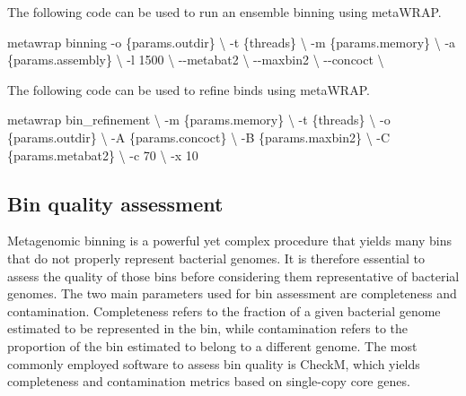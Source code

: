 \documentclass[
]{book}
\newenvironment{Shaded}{\begin{snugshade}}{\end{snugshade}}
\newcommand{\AttributeTok}[1]{\textcolor[rgb]{0.77,0.63,0.00}{#1}}
\newcommand{\DataTypeTok}[1]{\textcolor[rgb]{0.13,0.29,0.53}{#1}}
\newcommand{\ExtensionTok}[1]{#1}
\newcommand{\NormalTok}[1]{#1}
\begin{document}
The following code can be used to run an ensemble binning using metaWRAP.

\begin{Shaded}
\begin{Highlighting}[]
\ExtensionTok{metawrap}\NormalTok{ binning }\AttributeTok{{-}o}\NormalTok{ \{params.outdir\} }\DataTypeTok{\textbackslash{}}
    \AttributeTok{{-}t}\NormalTok{ \{threads\} }\DataTypeTok{\textbackslash{}}
    \AttributeTok{{-}m}\NormalTok{ \{params.memory\} }\DataTypeTok{\textbackslash{}}
    \AttributeTok{{-}a}\NormalTok{ \{params.assembly\} }\DataTypeTok{\textbackslash{}}
    \AttributeTok{{-}l}\NormalTok{ 1500 }\DataTypeTok{\textbackslash{}}
    \AttributeTok{{-}{-}metabat2} \DataTypeTok{\textbackslash{}}
    \AttributeTok{{-}{-}maxbin2} \DataTypeTok{\textbackslash{}}
    \AttributeTok{{-}{-}concoct} \DataTypeTok{\textbackslash{}}
\end{Highlighting}
\end{Shaded}

The following code can be used to refine binds using metaWRAP.

\begin{Shaded}
\begin{Highlighting}[]
\ExtensionTok{metawrap}\NormalTok{ bin\_refinement }\DataTypeTok{\textbackslash{}}
    \AttributeTok{{-}m}\NormalTok{ \{params.memory\} }\DataTypeTok{\textbackslash{}}
    \AttributeTok{{-}t}\NormalTok{ \{threads\} }\DataTypeTok{\textbackslash{}}
    \AttributeTok{{-}o}\NormalTok{ \{params.outdir\} }\DataTypeTok{\textbackslash{}}
    \AttributeTok{{-}A}\NormalTok{ \{params.concoct\} }\DataTypeTok{\textbackslash{}}
    \AttributeTok{{-}B}\NormalTok{ \{params.maxbin2\} }\DataTypeTok{\textbackslash{}}
    \AttributeTok{{-}C}\NormalTok{ \{params.metabat2\} }\DataTypeTok{\textbackslash{}}
    \AttributeTok{{-}c}\NormalTok{ 70 }\DataTypeTok{\textbackslash{}}
    \AttributeTok{{-}x}\NormalTok{ 10}
\end{Highlighting}
\end{Shaded}

\hypertarget{genome-resolved-qc}{%
\subsection*{Bin quality assessment}\label{genome-resolved-qc}}

Metagenomic binning is a powerful yet complex procedure that yields many bins that do not properly represent bacterial genomes. It is therefore essential to assess the quality of those bins before considering them representative of bacterial genomes. The two main parameters used for bin assessment are completeness and contamination. Completeness refers to the fraction of a given bacterial genome estimated to be represented in the bin, while contamination refers to the proportion of the bin estimated to belong to a different genome. The most commonly employed software to assess bin quality is CheckM, which yields completeness and contamination metrics based on single-copy core genes.
\end{document}
